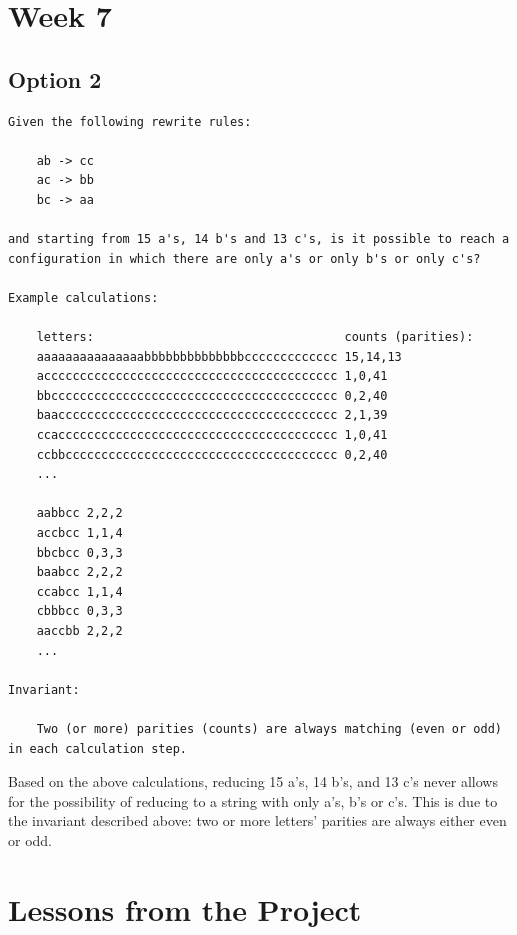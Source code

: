 \documentclass{article}
\theoremstyle{theorem}
\theoremstyle{definition}
\theoremstyle{remark}
\begin{document}
\section{Week 7}

\subsection{Option 2}

\begin{lstlisting}
Given the following rewrite rules:

    ab -> cc
    ac -> bb
    bc -> aa

and starting from 15 a's, 14 b's and 13 c's, is it possible to reach a configuration in which there are only a's or only b's or only c's?

Example calculations: 

    letters:                                   counts (parities):
    aaaaaaaaaaaaaaabbbbbbbbbbbbbbccccccccccccc 15,14,13
    accccccccccccccccccccccccccccccccccccccccc 1,0,41
    bbcccccccccccccccccccccccccccccccccccccccc 0,2,40
    baaccccccccccccccccccccccccccccccccccccccc 2,1,39
    ccaccccccccccccccccccccccccccccccccccccccc 1,0,41
    ccbbcccccccccccccccccccccccccccccccccccccc 0,2,40
    ...

    aabbcc 2,2,2
    accbcc 1,1,4
    bbcbcc 0,3,3
    baabcc 2,2,2
    ccabcc 1,1,4
    cbbbcc 0,3,3
    aaccbb 2,2,2
    ...

Invariant: 

    Two (or more) parities (counts) are always matching (even or odd) in each calculation step.
\end{lstlisting}

Based on the above calculations, reducing 15 a's, 14 b's, and 13 c's never allows for the possibility of reducing to a string with only a's, b's or c's. This is due to the invariant described above: two or more letters' parities are always either even or odd.

\section{Lessons from the Project}
\end{document}

